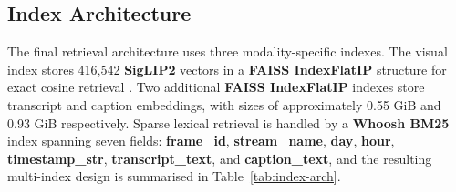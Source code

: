 \begin{table}[t]
\centering
\small
{}
\caption{OCR hallucination gate statistics. All 178,914 ungrounded tokens were stripped at a 100\% rate.}
\label{tab:ocr-gate}
\end{table}

\subsection{Index Architecture}
\label{sec:index-arch}

The final retrieval architecture uses three modality-specific indexes. The visual index stores 416,542 \textbf{SigLIP2} vectors in a \textbf{FAISS IndexFlatIP} structure for exact cosine retrieval \cite{johnson2021billion}. Two additional \textbf{FAISS IndexFlatIP} indexes store transcript and caption embeddings, with sizes of approximately 0.55 GiB and 0.93 GiB respectively. Sparse lexical retrieval is handled by a \textbf{Whoosh BM25} index spanning seven fields: \textbf{frame\_id}, \textbf{stream\_name}, \textbf{day}, \textbf{hour}, \textbf{timestamp\_str}, \textbf{transcript\_text}, and \textbf{caption\_text}, and the resulting multi-index design is summarised in Table~\ref{tab:index-arch}.

